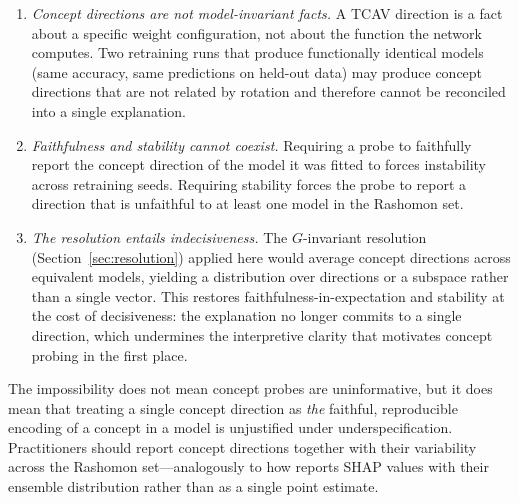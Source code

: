 \begin{enumerate}
\item \emph{Concept directions are not model-invariant facts.}
  A TCAV direction is a fact about a specific weight configuration, not about
  the function the network computes.  Two retraining runs that produce
  functionally identical models (same accuracy, same predictions on held-out
  data) may produce concept directions that are not related by rotation and
  therefore cannot be reconciled into a single explanation.

\item \emph{Faithfulness and stability cannot coexist.}
  Requiring a probe to faithfully report the concept direction of the model it
  was fitted to forces instability across retraining seeds.  Requiring
  stability forces the probe to report a direction that is unfaithful to at
  least one model in the Rashomon set.

\item \emph{The resolution entails indecisiveness.}
  The $G$-invariant resolution (Section~\ref{sec:resolution}) applied here
  would average concept directions across equivalent models, yielding a
  distribution over directions or a subspace rather than a single vector.
  This restores faithfulness-in-expectation and stability at the cost of
  decisiveness: the explanation no longer commits to a single direction, which
  undermines the interpretive clarity that motivates concept probing in the
  first place.
\end{enumerate}

The impossibility does not mean concept probes are uninformative, but it does
mean that treating a single concept direction as \emph{the} faithful,
reproducible encoding of a concept in a model is unjustified under
underspecification.  Practitioners should report concept directions together
with their variability across the Rashomon set---analogously to how
\DASH{} reports SHAP values with their ensemble distribution rather than as a
single point estimate.
